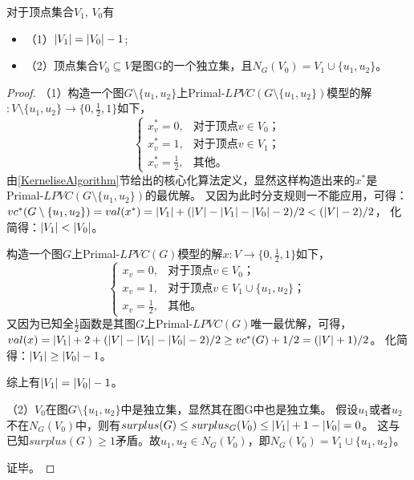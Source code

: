 \begin{claim}
对于顶点集合$V_1$, $V_0$有
\begin{itemize}
  \item{（1）}$\left\vert V_1 \right\vert = \left\vert V_0 \right\vert - 1$;
  \item{（2）}顶点集合$V_0 \subseteq V$是图G的一个独立集，且$N_G(V_0) = V_1 \cup \{u_1, u_2\}$。
\end{itemize}
\end{claim}
\begin{proof}
（1）构造一个图$G\setminus\{u_1, u_2\}$上Primal-$LPVC(G\setminus\{u_1, u_2\})$模型的解$ : V \setminus \{u_1, u_2\} \rightarrow \{0, \frac{1}{2}, 1\}$如下，
\begin{equation*}
   \begin{cases}
            x^*_v =0, & \mbox{对于顶点$v \in V_0$；}  \\
            x^*_v =1, & \mbox{对于顶点$v \in V_1$；}  \\
            x^*_v =\frac{1}{2}, & \mbox{其他。}
          \end{cases}
\end{equation*}
由\ref{KerneliseAlgorithm}节给出的核心化算法定义，显然这样构造出来的$x^*$是Primal-$LPVC(G\setminus\{u_1, u_2\})$的最优解。
又因为此时分支规则一不能应用，可得：
$vc^*(G\setminus\{u_1, u_2\}) = val(x^*) = \left\vert V_1 \right\vert + (\left\vert V \right\vert - \left\vert V_1 \right\vert - \left\vert V_0 \right\vert - 2) / 2 < (\left\vert V \right\vert - 2) / 2$，
化简得：$\left\vert V_1 \right\vert < \left\vert V_0 \right\vert$。

构造一个图$G$上Primal-$LPVC(G)$模型的解$x : V \rightarrow \{0, \frac{1}{2}, 1\}$如下，
\begin{equation*}
   \begin{cases}
            x_v =0, & \mbox{对于顶点$v \in V_0$；}  \\
            x_v =1, & \mbox{对于顶点$v \in V_1 \cup \{u_1, u_2\}$；}  \\
            x_v =\frac{1}{2}, & \mbox{其他。}
          \end{cases}
\end{equation*}
又因为已知全$\frac{1}{2}$函数是其图$G$上Primal-$LPVC(G)$唯一最优解，可得，
$val(x) = \left\vert V_1 \right\vert + 2 + (\left\vert V \right\vert - \left\vert V_1 \right\vert - \left\vert V_0 \right\vert - 2) / 2 \ge vc^*(G) + 1/2 = (\left\vert V \right\vert + 1) / 2$。
化简得：$\left\vert V_1 \right\vert \ge \left\vert V_0 \right\vert - 1$。

综上有$\left\vert V_1 \right\vert = \left\vert V_0 \right\vert - 1$。

（2）$V_0$在图$G\setminus\{u_1, u_2\}$中是独立集，显然其在图G中也是独立集。
假设$u_1$或者$u_2$不在$N_G(V_0)$中，则有$surplus(G) \le surplus_G(V_0) \le \left\vert V_1 \right\vert + 1 - \left\vert V_0 \right\vert = 0$。
这与已知$surplus(G) \ge 1$矛盾。故$u_1,u_2 \in N_G(V_0)$，即$N_G(V_0) = V_1 \cup \{u_1, u_2\}$。

证毕。
\end{proof}


